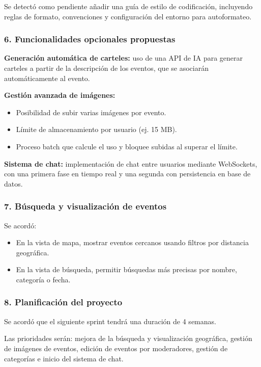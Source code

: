 Se detectó como pendiente añadir una guía de estilo de codificación, incluyendo reglas de formato, convenciones y configuración del entorno para autoformateo.

\subsubsection*{6. Funcionalidades opcionales propuestas}

\textbf{Generación automática de carteles:} uso de una API de IA para generar carteles a partir de la descripción de los eventos, que se asociarán automáticamente al evento.

\textbf{Gestión avanzada de imágenes:}
\begin{itemize}
    \item Posibilidad de subir varias imágenes por evento.
    \item Límite de almacenamiento por usuario (ej. 15 MB).
    \item Proceso batch que calcule el uso y bloquee subidas al superar el límite.
\end{itemize}

\textbf{Sistema de chat:} implementación de chat entre usuarios mediante WebSockets, con una primera fase en tiempo real y una segunda con persistencia en base de datos.

\subsubsection*{7. Búsqueda y visualización de eventos}
Se acordó:

\begin{itemize}
    \item En la vista de mapa, mostrar eventos cercanos usando filtros por distancia geográfica.
    \item En la vista de búsqueda, permitir búsquedas más precisas por nombre, categoría o fecha.
\end{itemize}

\subsubsection*{8. Planificación del proyecto}
Se acordó que el siguiente sprint tendrá una duración de 4 semanas.

Las prioridades serán: mejora de la búsqueda y visualización geográfica, gestión de imágenes de eventos, edición de eventos por moderadores, gestión de categorías e inicio del sistema de chat.

